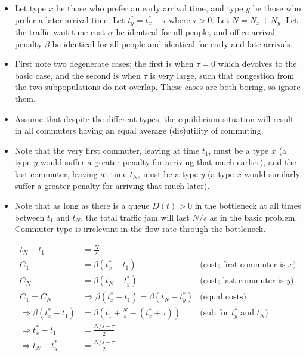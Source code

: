 \documentclass[]{article}
\providecommand{\tightlist}{%
  \setlength{\itemsep}{0pt}\setlength{\parskip}{0pt}}
\begin{document}
\begin{itemize}
\tightlist
\item
  Let type \(x\) be those who prefer an early arrival time, and type
  \(y\) be those who prefer a later arrival time. Let
  \(t_y^* = t_x^* + \tau\) where \(\tau > 0\). Let \(N = N_x + N_y\).
  Let the traffic wait time cost \(\alpha\) be identical for all people,
  and office arrival penalty \(\beta\) be identical for all people and
  identical for early and late arrivals.
\item
  First note two degenerate cases; the first is when \(\tau = 0\) which
  devolves to the basic case, and the second is when \(\tau\) is very
  large, such that congestion from the two subpopulations do not
  overlap. These cases are both boring, so ignore them.
\item
  Assume that despite the different types, the equilibrium situation
  will result in all commuters having an equal average (dis)utility of
  commuting.
\item
  Note that the very first commuter, leaving at time \(t_1\), must be a
  type \(x\) (a type \(y\) would suffer a greater penalty for arriving
  that much earlier), and the last commuter, leaving at time \(t_N\),
  must be a type \(y\) (a type \(x\) would similarly suffer a greater
  penalty for arriving that much later).
\item
  Note that as long as there is a queue \(D(t) > 0\) in the bottleneck
  at all times between \(t_1\) and \(t_N\), the total traffic jam will
  last \(N/s\) as in the basic problem. Commuter type is irrelevant in
  the flow rate through the bottleneck.

  \begin{align*}
    t_N - t_1 &= \frac{N}{s}\\
    C_1 &= \beta (t_x^* - t_1) 
    &\text{(cost; first commuter is $x$)}\\
    C_N &= \beta (t_N - t_y^*) 
    &\text{(cost; last commuter is $y$)}\\
    C_1 = C_N &\Rightarrow \beta (t_x^* - t_1) = \beta (t_N - t_y^*)
    &\text{(equal costs)}\\
    \Rightarrow \beta (t_x^* - t_1) &= \beta (t_1 + \frac{N}{s} - (t_x^* + \tau))
    &\text{(sub for $t_y^*$ and $t_N$)}\\
    \Rightarrow t_x^* - t_1 &= \frac{N/s - \tau}{2}\\
    \Rightarrow t_N - t_y^* &= \frac{N/s - \tau}{2}
  \end{align*}
\end{itemize}
\end{document}
